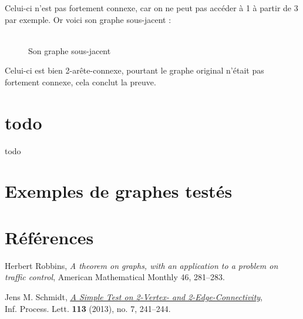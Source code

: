 \documentclass{article}      %
\begin{document}
Celui-ci n'est pas fortement connexe, car on ne peut pas accéder à 1 à partir de 3 par exemple.
Or voici son graphe sous-jacent :
\begin{figure}[H]
    \centering
    \\Son graphe sous-jacent
\end{figure}
Celui-ci est bien 2-arête-connexe, pourtant le graphe original n'était pas fortement connexe, cela conclut la preuve.




\section{todo}
todo
\section{Exemples de graphes testés}



\section{Références}
\begin{thebibliography}{9}
Herbert Robbins, \textit{A theorem on graphs, with an application to a problem on traffic control}, American Mathematical Monthly 46, 281–283.

Jens M. Schmidt, \href{https://arxiv.org/ftp/arxiv/papers/1209/1209.0700.pdf}{\underline{\textit{A Simple Test on 2-Vertex- and 2-Edge-Connectivity}}},
\\Inf. Process. Lett. \textbf{113} (2013), no. 7, 241–244.
\end{thebibliography}
\end{document}
